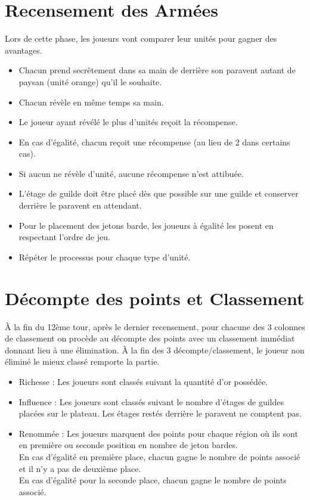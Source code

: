 \documentclass[10pt, a4paper]{article}	%
\begin{document}
\begin{multicols}{3}
\section{Recensement des Armées} %
\label{sec:recensement_des_armees}
Lors de cette phase, les joueurs vont comparer leur unités pour gagner des avantages.
\begin{itemize}
    \item Chacun prend secrêtement dans sa main de derrière son paravent autant de paysan (unité orange) qu'il le souhaite.
    \item Chacun révèle en même temps sa main.
    \item Le joueur ayant révélé le plus d'unités reçoit la récompense.
    \item En cas d'égalité, chacun reçoit une récompense (au lieu de 2 dans certains cas).
    \item Si aucun ne révèle d'unité, aucune récompense n'est attibuée.
    \item L'étage de guilde doit être placé dès que possible sur une guilde et conserver derrière le paravent en attendant.
    \item Pour le placement des jetons barde, les joueurs à égalité les posent en respectant l'ordre de jeu.
    \item Répéter le processus pour chaque type d'unité.
\end{itemize}


\section{Décompte des points et Classement} %
\label{sec:decompte_des_points_et_classement}
À la fin du 12ème tour, après le dernier recensement, pour chacune des 3 colonnes de classement on procède au décompte
des points avec un classement immédiat donnant lieu à une élimination. À la fin des 3 décompte/classement, le joueur
non éliminé le mieux classé remporte la partie.
\begin{itemize}
    \item Richesse : Les joueurs sont classés suivant la quantité d'or possédée.
    \item Influence : Les joueurs sont classés suivant le nombre d'étages de guildes placées sur le plateau.
    Les étages restés derrière le paravent ne comptent pas.
    \item Renommée : Les joueurs marquent des points pour chaque région où ils sont en première ou seconde position en nombre de jeton bardes.\\
    En cas d'égalité en première place, chacun gagne le nombre de points associé et il n'y a pas de deuxième place.\\
    En cas d'égalité pour la seconde place, chacun gagne le nombre de points associé.
\end{itemize}



\end{multicols}
\end{document}
